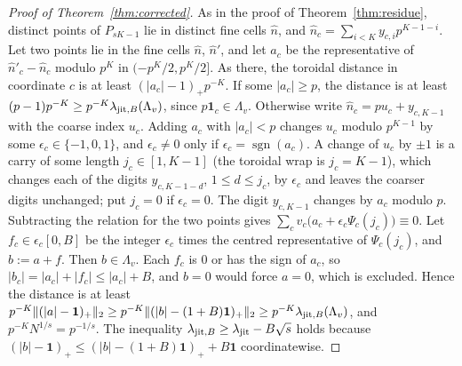 \begin{proof}[Proof of Theorem~\ref{thm:corrected}]
As in the proof of Theorem~\ref{thm:residue}, distinct points of $P_{sK-1}$ lie in distinct fine cells $\hat n$, and $\hat n_c=\sum_{i<K}y_{c,i}p^{K-1-i}$. Let two points lie in the fine cells $\hat n$, $\hat n'$, and let $a_c$ be the representative of $\hat n'_c-\hat n_c$ modulo $p^K$ in $(-p^K/2,p^K/2]$. As there, the toroidal distance in coordinate $c$ is at least $(|a_c|-1)_+p^{-K}$. If some $|a_c|\ge p$, the distance is at least $(p-1)p^{-K}\ge p^{-K}\lambda_{\mathrm{jit},B}(\Lambda_v)$, since $p\mathbf 1_c\in\Lambda_v$. Otherwise write $\hat n_c=pu_c+y_{c,K-1}$ with the coarse index $u_c$. Adding $a_c$ with $|a_c|<p$ changes $u_c$ modulo $p^{K-1}$ by some $\epsilon_c\in\{-1,0,1\}$, and $\epsilon_c\ne0$ only if $\epsilon_c=\operatorname{sgn}(a_c)$. A change of $u_c$ by $\pm1$ is a carry of some length $j_c\in[1,K-1]$ (the toroidal wrap is $j_c=K-1$), which changes each of the digits $y_{c,K-1-d}$, $1\le d\le j_c$, by $\epsilon_c$ and leaves the coarser digits unchanged; put $j_c=0$ if $\epsilon_c=0$. The digit $y_{c,K-1}$ changes by $a_c$ modulo $p$. Subtracting the relation for the two points gives $\sum_cv_c\bigl(a_c+\epsilon_c\Psi_c(j_c)\bigr)\equiv0$. Let $f_c\in\epsilon_c[0,B]$ be the integer $\epsilon_c$ times the centred representative of $\Psi_c(j_c)$, and $b:=a+f$. Then $b\in\Lambda_v$. Each $f_c$ is $0$ or has the sign of $a_c$, so $|b_c|=|a_c|+|f_c|\le|a_c|+B$, and $b=0$ would force $a=0$, which is excluded. Hence the distance is at least $p^{-K}\|(|a|-\mathbf 1)_+\|_2\ge p^{-K}\|(|b|-(1+B)\mathbf 1)_+\|_2\ge p^{-K}\lambda_{\mathrm{jit},B}(\Lambda_v)$, and $p^{-K}N^{1/s}=p^{-1/s}$. The inequality $\lambda_{\mathrm{jit},B}\ge\lambda_{\mathrm{jit}}-B\sqrt s$ holds because $(|b|-\mathbf 1)_+\le(|b|-(1+B)\mathbf 1)_++B\mathbf 1$ coordinatewise.
\end{proof}

